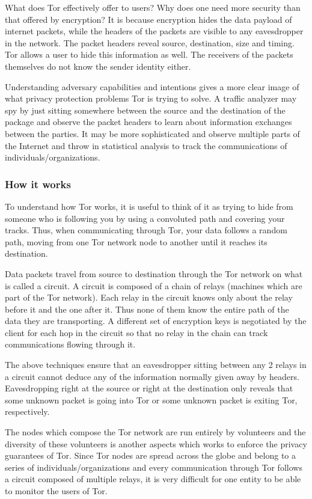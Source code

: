 \documentclass[11pt]{article} %
\begin{document}
What does Tor effectively offer to users? Why does one need more security than that offered by encryption? It is because encryption hides the data payload of internet packets, while the headers of the packets are visible to any eavesdropper in the network. The packet headers reveal source, destination, size and timing. Tor allows a user to hide this information as well. The receivers of the packets themselves do not know the sender identity either.

Understanding adversary capabilities and intentions gives a more clear image of what privacy protection problems Tor is trying to solve. A traffic analyzer may spy by just sitting somewhere between the source and the destination of the package and observe the packet headers to learn about information exchanges between the parties. It may be more sophisticated and observe multiple parts of the Internet and throw in statistical analysis to track the communications of individuals/organizations.

\subsubsection{How it works}

To understand how Tor works, it is useful to think of it as trying to hide from someone who is following you by using a convoluted path and covering your tracks. Thus, when communicating through Tor, your data follows a random path, moving from one Tor network node to another until it reaches its destination.

Data packets travel from source to destination through the Tor network on what is called a circuit. A circuit is composed of a chain of relays (machines which are part of the Tor network). Each relay in the circuit knows only about the relay before it and the one after it. Thus none of them know the entire path of the data they are transporting. A different set of encryption keys is negotiated by the client for each hop in the circuit so that no relay in the chain can track communications flowing through it. 

The above techniques ensure that an eavesdropper sitting between any 2 relays in a circuit cannot deduce any of the information normally given away by headers. Eavesdropping right at the source or right at the destination only reveals that some unknown packet is going into Tor or some unknown packet is exiting Tor, respectively.

The nodes which compose the Tor network are run entirely by volunteers and the diversity of these volunteers is another aspects which works to enforce the privacy guarantees of Tor. Since Tor nodes are spread across the globe and belong to a series of individuals/organizations and every communication through Tor follows a circuit composed of multiple relays, it is very difficult for one entity to be able to monitor the users of Tor.
\end{document}
